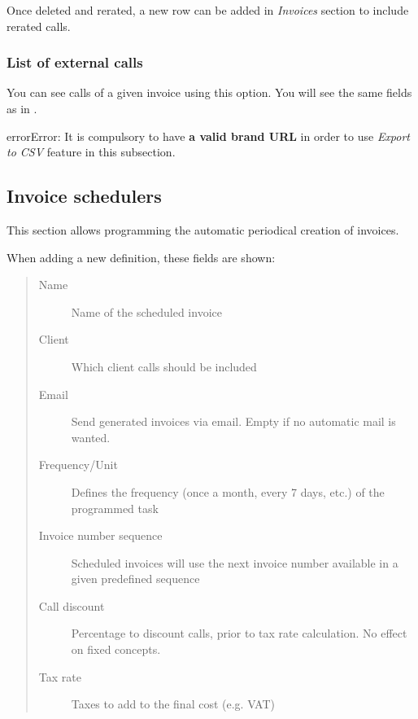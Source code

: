 \documentclass[letterpaper,10pt,english]{sphinxmanual}
\begin{document}
Once deleted and rerated, a new row can be added in \emph{Invoices} section to include rerated calls.


\subsubsection{List of external calls}
\label{administration_portal/brand/invoicing/invoices:list-of-external-calls}
You can see calls of a given invoice using this option. You will see the same fields as in {\hyperref[administration_portal/platform/external_calls:external\string-calls]{}}.

\begin{notice}{error}{Error:}
It is compulsory to have \textbf{a valid brand URL} in order to use \emph{Export to CSV} feature in this subsection.
\end{notice}


\subsection{Invoice schedulers}
\label{administration_portal/brand/invoicing/invoice_schedulers::doc}\label{administration_portal/brand/invoicing/invoice_schedulers:invoice-schedulers}\label{administration_portal/brand/invoicing/invoice_schedulers:id1}
This section allows programming the automatic periodical creation of invoices.

When adding a new definition, these fields are shown:
\begin{quote}
\begin{description}
\item[{Name}] \leavevmode
Name of the scheduled invoice

\item[{Client}] \leavevmode
Which client calls should be included

\item[{Email}] \leavevmode
Send generated invoices via email. Empty if no automatic mail is wanted.

\item[{Frequency/Unit}] \leavevmode
Defines the frequency (once a month, every 7 days, etc.) of the programmed task

\item[{Invoice number sequence}] \leavevmode
Scheduled invoices will use the next invoice number available in a given predefined sequence

\item[{Call discount}] \leavevmode
Percentage to discount calls, prior to tax rate calculation. No effect on fixed concepts.

\item[{Tax rate}] \leavevmode
Taxes to add to the final cost (e.g. VAT)

\end{description}
\end{quote}
\end{document}

